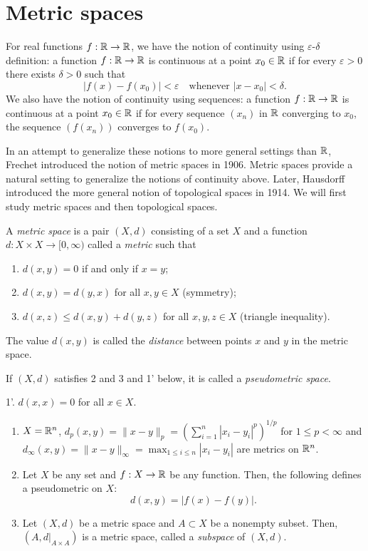 \section{Metric spaces}

\ifdefined\startafterexampletwotwo
  \setcounter{theorem}{2}
\else

For real functions $f:\mathbb{R}\to\mathbb{R}$, we have the notion of continuity using $\varepsilon$-$\delta$ definition: a function $f:\mathbb{R}\to\mathbb{R}$ is continuous at a point $x_0\in\mathbb{R}$ if for every $\varepsilon>0$ there exists $\delta>0$ such that
\[
|f(x)-f(x_0)|<\varepsilon \quad \text{whenever } |x-x_0|<\delta.
\]
We also have the notion of continuity using sequences: a function $f:\mathbb{R}\to\mathbb{R}$ is continuous at a point $x_0\in\mathbb{R}$ if for every sequence $(x_n)$ in $\mathbb{R}$ converging to $x_0$, the sequence $(f(x_n))$ converges to $f(x_0)$. 

In an attempt to generalize these notions to more general settings than $\mathbb{R}$, Frechet introduced the notion of metric spaces in 1906. Metric spaces provide a natural setting to generalize the notions of continuity above. Later, Hausdorff introduced the more general notion of topological spaces in 1914. We will first study metric spaces and then topological spaces.

\begin{definition}
A \emph{metric space} is a pair $(X,d)$ consisting of a set $X$ and a
function $d\colon X\times X\to [0,\infty)$ called a \emph{metric} such that
\begin{enumerate}
  \item $d(x,y)=0$ if and only if $x=y$;
  \item $d(x,y)=d(y,x)$ for all $x,y\in X$ (symmetry);
  \item $d(x,z)\le d(x,y)+d(y,z)$ for all $x,y,z\in X$ (triangle inequality).
\end{enumerate}
The value $d(x,y)$ is called the \emph{distance} between points $x$ and $y$ in the metric space.

If $(X,d)$ satisfies 2 and 3 and 1' below, it is called a \emph{pseudometric space}. 

1'. $d(x,x)=0$ for all $x\in X$.
\end{definition}

\begin{example}
  \begin{enumerate}
    \item $X=\mathbb{R}^n$, $d_p(x,y)=\|x-y\|_p=\left(\sum_{i=1}^n |x_i-y_i|^p\right)^{1/p}$ for $1\le p<\infty$ and $d_\infty(x,y)=\|x-y\|_\infty=\max_{1\le i\le n}|x_i-y_i|$ are metrics on $\mathbb{R}^n$. 
    \item Let $X$ be any set and $f:X\to \mathbb{R}$ be any function. Then, the following defines a pseudometric on $X$:
      \[
      d(x,y) = |f(x)-f(y)|.
      \]
    \item Let $(X,d)$ be a metric space and $A\subset X$ be a nonempty subset. Then, $(A,d|_{A\times A})$ is a metric space, called a \emph{subspace} of $(X,d)$.
  \end{enumerate}
\end{example}

